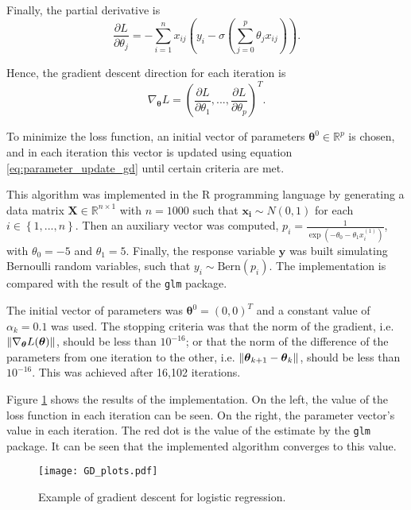 Finally, the partial derivative is
\begin{equation}
  \frac{\partial L}{\partial \theta_j} = - \sum_{i = 1}^n { x_{ij}(y_i - \sigma(\sum_{j=0}^{p}{\theta_j x_{ij}})) }.
\end{equation}

Hence, the gradient descent direction for each iteration is
\begin{equation}
  \nabla_{\boldsymbol{\theta}} L = \left( \frac{\partial L}{\partial \theta_1}, ..., \frac{\partial L}{\partial \theta_p} \right)^T.
\end{equation}

To minimize the loss function, an initial vector of parameters $\boldsymbol{\theta}^0 \in \mathbb{R}^p$ is chosen, and in each iteration this vector is updated using equation \eqref{eq:parameter_update_gd} until certain criteria are met.

This algorithm was implemented in the R programming language \cite{R_manual} by generating a data matrix $\boldsymbol{X} \in \mathbb{R}^{n \times 1}$ with $n = 1000$ such that $\boldsymbol{x_i} \sim N(0, 1)$ for each $i \in \left\{1, ..., n \right\}$.
Then an auxiliary vector was computed, $p_i = \frac{1}{\exp \left( - \theta_0 - \theta_1 x_i^{(1)} \right)}$, with $\theta_0 = -5$ and $\theta_1 = 5$. Finally, the response variable $\boldsymbol{y}$ was built simulating Bernoulli random variables, such that $y_i \sim \mathrm{Bern}(p_i)$.
The implementation is compared with the result of the \texttt{glm} package.

The initial vector of parameters was $\boldsymbol{\theta}^0 = (0, 0)^T$ and a constant value of $\alpha_k = 0.1$ was used. The stopping criteria was that the norm of the gradient, i.e. $\left\lVert \nabla_{\boldsymbol{\theta}} L(\boldsymbol{\theta}) \right\rVert$, should be less than $10^{-16}$; or that the norm of the difference of the parameters from one iteration to the other, i.e. $\left\lVert \boldsymbol{\theta}_{k+1} - \boldsymbol{\theta}_k \right\rVert$, should be less than $10^{-16}$. This was achieved after 16,102 iterations.

Figure \ref{fig:GD_plots} shows the results of the implementation. On the left, the value of the loss function in each iteration can be seen. On the right, the parameter vector's value in each iteration. The red dot is the value of the estimate by the \texttt{glm} package. It can be seen that the implemented algorithm converges to this value.

\begin{figure}[H]
    \centering
    \texttt{[image: GD\_plots.pdf]}
    \caption{Example of gradient descent for logistic regression.}
    \label{fig:GD_plots}
\end{figure}

